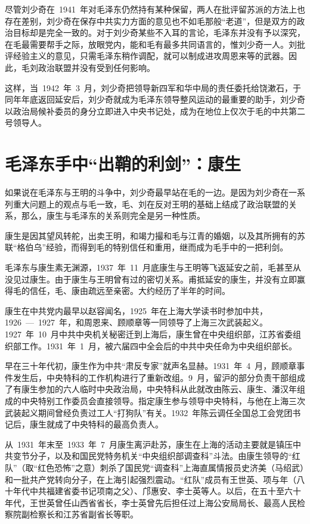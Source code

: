 尽管刘少奇在~1941~年对毛泽东仍然持有某种保留，两人在批评留苏派的方法上也存在差别，刘少奇在保存中共实力方面的意见也不如毛那般“老道”，但是双方的政治目标却是完全一致的。对于刘少奇某些不入耳的言论，毛泽东并没有予以深究，在毛最需要帮手之际，放眼党内，能和毛有最多共同语言的，惟刘少奇一人。刘批评经验主义的意见，只需毛泽东稍作调配，就可以制成进攻周恩来等的武器。因此，毛刘政治联盟并没有受到任何影响。

这样，当~1942~年~3~月，刘少奇把领导新四军和华中局的责任委托给饶漱石，于同年年底返回延安后，刘少奇就成为毛泽东领导整风运动的最重要的助手，刘少奇以政治局候补委员的身分立即进入中央书记处，成为在地位上仅次于毛的中共第二号领导人。

\section{毛泽东手中“出鞘的利剑”：康生}

如果说在毛泽东与王明的斗争中，刘少奇最早站在毛的一边。是因为刘少奇在一系列重大问题上的观点与毛一致，毛、刘在反对王明的基础上结成了政治联盟的关系，那么，康生与毛泽东的关系则完全是另一种性质。

康生是因其望风转舵，出卖王明，和竭力撮和毛与江青的婚姻，以及其所拥有的苏联“格伯乌”经验，而得到毛的特别信任和重用，继而成为毛手中的一把利剑。

毛泽东与康生素无渊源，1937~年~11~月底康生与王明等飞返延安之前，毛甚至从没见过康生。由于康生与王明曾有过的密切关系。甫抵延安的康生，并没有立即赢得毛的信任，毛、康由疏远至亲密。大约经历了半年的时间。

康生在中共党内最早以赵容闻名，1925~年在上海大学读书时参加中共，1926~—~1927~年，和周恩来、顾顺章等一同领导了上海三次武装起义。1927~年~10~月中共中央机关秘密迁到上海后，康生曾在中央组织部，江苏省委组织部工作。1931~年~1~月，被六届四中全会后的中共中央任命为中央组织部长。

早在三十年代初，康生作为中共“肃反专家”就声名显赫。1931~年~4~月，顾顺章事件发生后，中央特科的工作机构进行了重新改组。9~月，留沪的部分负责干部组成了有康生参加的六人临时中央政治局，中央特科从此就改由陈云、康生、潘汉年组成的中央特别工作委员会直接领导。指定康生参与领导中央特科，与他在上海三次武装起义期间曾经负责过工人“打狗队”有关。1932~年陈云调任全国总工会党团书记后，康生就成了中央特科的最高负责人。

从~1931~年末至~1933~年~7~月康生离沪赴苏，康生在上海的活动主要就是镇压中共变节分子，以及和国民党特务机关“中央组织部调查科”斗法。由康生领导的“红队”（取“红色恐怖”之意）刺杀了国民党“调查科”上海直属情报员史济美（马绍武）和一批共产党转向分子，在上海引起强烈震动。“红队”成员有王世英、项与年（八十年代中共福建省委书记项南之父）、邝惠安、李士英等人。以后，在五十至六十年代，王世英曾任山西省省长，李士英曾先后担任过上海公安局局长、最高人民检察院副检察长和江苏省副省长等职。

